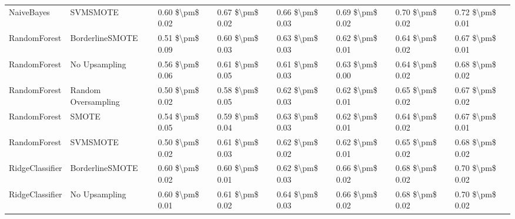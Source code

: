 \begin{tabular}{llllllll}
                     NaiveBayes &                      SVMSMOTE &     0.60 \$\textbackslash pm\$ 0.02 &           0.67 \$\textbackslash pm\$ 0.02 &       0.66 \$\textbackslash pm\$ 0.03 &        0.69 \$\textbackslash pm\$ 0.02 &                         0.70 \$\textbackslash pm\$ 0.02 &     0.72 \$\textbackslash pm\$ 0.01 \\
                   RandomForest &               BorderlineSMOTE &     0.51 \$\textbackslash pm\$ 0.09 &           0.60 \$\textbackslash pm\$ 0.03 &       0.63 \$\textbackslash pm\$ 0.03 &        0.62 \$\textbackslash pm\$ 0.01 &                         0.64 \$\textbackslash pm\$ 0.02 &     0.67 \$\textbackslash pm\$ 0.01 \\
                   RandomForest &                 No Upsampling &     0.56 \$\textbackslash pm\$ 0.06 &           0.61 \$\textbackslash pm\$ 0.05 &       0.61 \$\textbackslash pm\$ 0.03 &        0.63 \$\textbackslash pm\$ 0.00 &                         0.64 \$\textbackslash pm\$ 0.02 &     0.68 \$\textbackslash pm\$ 0.02 \\
                   RandomForest &           Random Oversampling &     0.50 \$\textbackslash pm\$ 0.02 &           0.58 \$\textbackslash pm\$ 0.05 &       0.62 \$\textbackslash pm\$ 0.03 &        0.62 \$\textbackslash pm\$ 0.01 &                         0.65 \$\textbackslash pm\$ 0.02 &     0.67 \$\textbackslash pm\$ 0.02 \\
                   RandomForest &                         SMOTE &     0.54 \$\textbackslash pm\$ 0.05 &           0.59 \$\textbackslash pm\$ 0.04 &       0.63 \$\textbackslash pm\$ 0.03 &        0.62 \$\textbackslash pm\$ 0.01 &                         0.64 \$\textbackslash pm\$ 0.02 &     0.67 \$\textbackslash pm\$ 0.01 \\
                   RandomForest &                      SVMSMOTE &     0.50 \$\textbackslash pm\$ 0.02 &           0.61 \$\textbackslash pm\$ 0.03 &       0.62 \$\textbackslash pm\$ 0.02 &        0.62 \$\textbackslash pm\$ 0.01 &                         0.65 \$\textbackslash pm\$ 0.02 &     0.68 \$\textbackslash pm\$ 0.02 \\
                RidgeClassifier &               BorderlineSMOTE &     0.60 \$\textbackslash pm\$ 0.02 &           0.60 \$\textbackslash pm\$ 0.01 &       0.62 \$\textbackslash pm\$ 0.03 &        0.66 \$\textbackslash pm\$ 0.02 &                         0.68 \$\textbackslash pm\$ 0.02 &     0.70 \$\textbackslash pm\$ 0.02 \\
                RidgeClassifier &                 No Upsampling &     0.60 \$\textbackslash pm\$ 0.01 &           0.61 \$\textbackslash pm\$ 0.02 &       0.64 \$\textbackslash pm\$ 0.03 &        0.66 \$\textbackslash pm\$ 0.02 &                         0.68 \$\textbackslash pm\$ 0.02 &     0.70 \$\textbackslash pm\$ 0.02 \\

\end{tabular}
